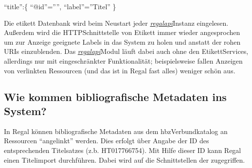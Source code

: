 \documentclass[letterpaper,10pt,english]{sphinxmanual}
\begin{document}
\sphinxAtStartPar
{}

\sphinxAtStartPar
“title”:\{ “@id”=””, “label”=”Titel” \}

\sphinxAtStartPar
Die etikett Datenbank wird beim Neustart jeder
{\hyperref[\detokenize{toscience:_regal_api_2}]{\emph{regal\sphinxhyphen{}api}}}\sphinxhyphen{}Instanz eingelesen. Außerdem wird die
HTTP\sphinxhyphen{}Schnittstelle von Etikett immer wieder angesprochen um zur Anzeige
geeignete Labels in das System zu holen und anstatt der rohen URIs
einzublenden. Das {\hyperref[\detokenize{toscience:_regal_api_2}]{\emph{regal\sphinxhyphen{}api}}}\sphinxhyphen{}Modul läuft dabei auch
ohne den Etikett\sphinxhyphen{}Services, allerdings nur mit eingeschränkter
Funktionalität; beispielsweise fallen Anzeigen von verlinkten Ressourcen
(und das ist in Regal fast alles) weniger schön aus.


\subsection{Wie kommen bibliografische Metadaten ins System?}
\label{\detokenize{toscience:wie-kommen-bibliografische-metadaten-ins-system}}\label{\detokenize{toscience:id6}}
\sphinxAtStartPar
In Regal können bibliografische Metadaten aus dem hbz\sphinxhyphen{}Verbundkatalog an
Ressourcen “angelinkt” werden. Dies erfolgt über Angabe der ID des
entsprechenden Titelsatzes (z.b. HT017766754). Mit Hilfe dieser ID kann
Regal einen Titelimport durchführen. Dabei wird auf die Schnittstellen
der  zugegriffen.
\end{document}
